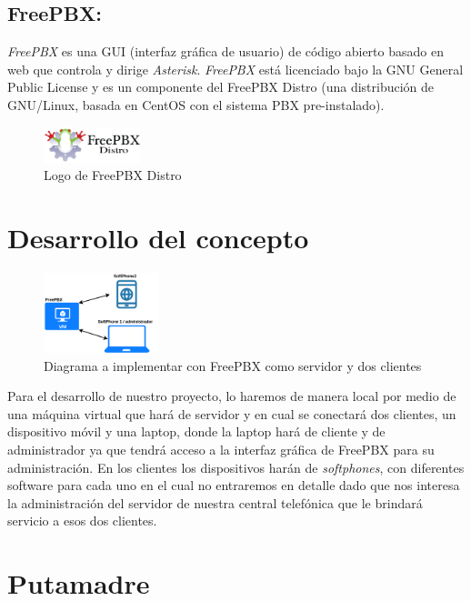 \documentclass[conference]{IEEEtran}
\begin{document}
\subsection{\textbf{ FreePBX:}}  
\textit{FreePBX} es una GUI (interfaz gráfica de usuario) de código abierto basado en web que controla y dirige \textit{Asterisk}. \textit{FreePBX} está licenciado bajo la GNU General Public License y es un componente del FreePBX Distro (una distribución de GNU/Linux, basada en CentOS con el sistema PBX pre-instalado).
\begin{figure}[h]
	\centerline{\includegraphics[width=0.25\textwidth]{img/freepbx01.png}}
	\caption{Logo de FreePBX Distro}
	\label{fig:ant04}
\end{figure}


\section{Desarrollo del concepto}\label{sec:ddc}
\begin{figure}[h]
	\centerline{\includegraphics[width=0.3\textwidth]{img/diagrama01.png}}
	\caption{Diagrama a implementar con FreePBX como servidor y dos clientes}
	\label{fig:ddc01}
\end{figure}

Para el desarrollo de nuestro proyecto, lo haremos de manera local por medio de una máquina virtual que hará de servidor y en cual se conectará dos clientes, un dispositivo móvil y una laptop, donde la laptop hará de cliente y de administrador ya que tendrá acceso a la interfaz gráfica de FreePBX para su administración. En los clientes los dispositivos harán de \textit{softphones}, con diferentes software para cada uno en el cual no entraremos en detalle dado que nos interesa la administración del servidor de nuestra central telefónica que le brindará servicio a esos dos clientes.

\section{Putamadre}
\end{document}
